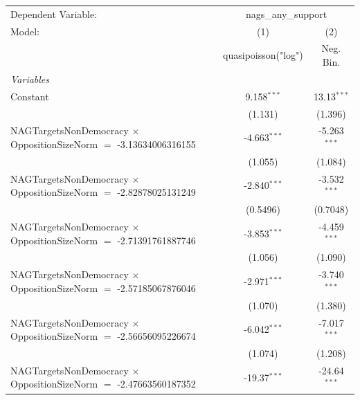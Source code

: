 
\begingroup
\centering
\begin{tabular}{lcc}
   \tabularnewline \midrule \midrule
   Dependent Variable: & \multicolumn{2}{c}{nags\_any\_support}\\
   Model:                                                                       & (1)                  & (2)\\  
                                                                                &  quasipoisson("log") & Neg. Bin.\\  
   \midrule
   \emph{Variables}\\
   Constant                                                                     & 9.158$^{***}$        & 13.13$^{***}$\\   
                                                                                & (1.131)              & (1.396)\\   
   NAGTargetsNonDemocracy $\times$ OppositionSizeNorm $=$ -3.13634006316155     & -4.663$^{***}$       & -5.263$^{***}$\\   
                                                                                & (1.055)              & (1.084)\\   
   NAGTargetsNonDemocracy $\times$ OppositionSizeNorm $=$ -2.82878025131249     & -2.840$^{***}$       & -3.532$^{***}$\\   
                                                                                & (0.5496)             & (0.7048)\\   
   NAGTargetsNonDemocracy $\times$ OppositionSizeNorm $=$ -2.71391761887746     & -3.853$^{***}$       & -4.459$^{***}$\\   
                                                                                & (1.056)              & (1.090)\\   
   NAGTargetsNonDemocracy $\times$ OppositionSizeNorm $=$ -2.57185067876046     & -2.971$^{***}$       & -3.740$^{***}$\\   
                                                                                & (1.070)              & (1.380)\\   
   NAGTargetsNonDemocracy $\times$ OppositionSizeNorm $=$ -2.56656095226674     & -6.042$^{***}$       & -7.017$^{***}$\\   
                                                                                & (1.074)              & (1.208)\\   
   NAGTargetsNonDemocracy $\times$ OppositionSizeNorm $=$ -2.47663560187352     & -19.37$^{***}$       & -24.64$^{***}$\\   

\end{tabular}
